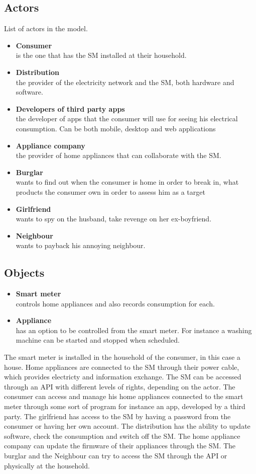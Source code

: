\subsection{Actors}
List of actors in the model.
\begin{itemize}
\item \textbf{Consumer}\\ is the one that has the SM installed at their household.
\item \textbf{Distribution}\\ the provider of the electricity network and the SM, both hardware and software.
\item \textbf{Developers of third party apps}\\ the developer of apps that the consumer will use for seeing his electrical consumption. Can be both mobile, desktop and web applications
\item \textbf{Appliance company}\\ the provider of home appliances that can collaborate with the SM.
\item \textbf{Burglar}\\ wants to find out when the consumer is home in order to break in, what products the consumer own in order to assess him as a target
\item \textbf{Girlfriend}\\ wants to spy on the husband, take revenge on her ex-boyfriend.
\item \textbf{Neighbour}\\ wants to payback his annoying neighbour.
\end{itemize}

\subsection{Objects}
\begin{itemize}
\item \textbf{Smart meter}\\ controls home appliances and also records consumption for each.
\item \textbf{Appliance}\\ has an option to be controlled from the smart meter. For instance a washing machine can be started and stopped when scheduled.
\end{itemize}

The smart meter is installed in the household of the consumer, in this case a house.
Home appliances are connected to the SM through their power cable, which provides electricty and information exchange.
The SM can be accessed through an API with different levels of rights, depending on the actor.
The consumer can access and manage his home appliances connected to the smart meter through some sort of program for instance an app, developed by a third party.
The girlfriend has access to the SM by having a password from the consumer or having her own account.
The distribution has the ability to update software, check the consumption and switch off the SM.
The home appliance company can update the firmware of their appliances through the SM.
The burglar and the Neighbour can try to access the SM through the API or physically at the household.

